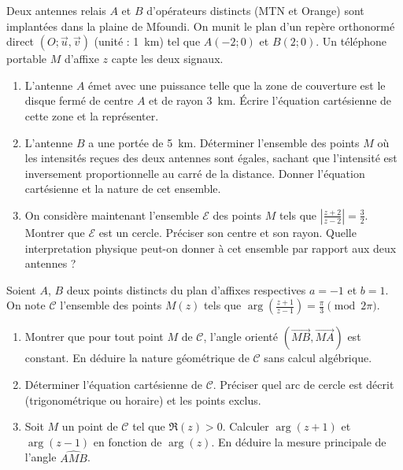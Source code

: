 \documentclass[11pt]{article}
\begin{document}
\begin{exercice}
Deux antennes relais $A$ et $B$ d'opérateurs distincts (MTN et Orange) sont implantées dans la plaine de Mfoundi. On munit le plan d'un repère orthonormé direct $(O; \vec{u}, \vec{v})$ (unité : \SI{1}{km}) tel que $A(-2;0)$ et $B(2;0)$. Un téléphone portable $M$ d'affixe $z$ capte les deux signaux.
\begin{enumerate}
    \item L'antenne $A$ émet avec une puissance telle que la zone de couverture est le disque fermé de centre $A$ et de rayon \SI{3}{km}. Écrire l'équation cartésienne de cette zone et la représenter.
    \item L'antenne $B$ a une portée de \SI{5}{km}. Déterminer l'ensemble des points $M$ où les intensités reçues des deux antennes sont égales, sachant que l'intensité est inversement proportionnelle au carré de la distance. Donner l'équation cartésienne et la nature de cet ensemble.
    \item On considère maintenant l'ensemble $\mathcal{E}$ des points $M$ tels que $\left|\frac{z+2}{z-2}\right| = \frac{3}{2}$. Montrer que $\mathcal{E}$ est un cercle. Préciser son centre et son rayon. Quelle interpretation physique peut-on donner à cet ensemble par rapport aux deux antennes ?
\end{enumerate}
\end{exercice}

\begin{exercice}
Soient $A$, $B$ deux points distincts du plan d'affixes respectives $a = -1$ et $b = 1$. On note $\mathcal{C}$ l'ensemble des points $M(z)$ tels que $\arg\left(\frac{z+1}{z-1}\right) = \frac{\pi}{3} \pmod{2\pi}$.
\begin{enumerate}
    \item Montrer que pour tout point $M$ de $\mathcal{C}$, l'angle orienté $(\overrightarrow{MB}, \overrightarrow{MA})$ est constant. En déduire la nature géométrique de $\mathcal{C}$ sans calcul algébrique.
    \item Déterminer l'équation cartésienne de $\mathcal{C}$. Préciser quel arc de cercle est décrit (trigonométrique ou horaire) et les points exclus.
    \item Soit $M$ un point de $\mathcal{C}$ tel que $\Re(z) > 0$. Calculer $\arg(z+1)$ et $\arg(z-1)$ en fonction de $\arg(z)$. En déduire la mesure principale de l'angle $\widehat{AMB}$.
\end{enumerate}
\end{exercice}
\end{document}
